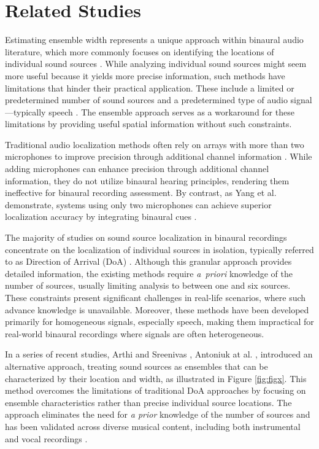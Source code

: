 \section{Related Studies}

Estimating ensemble width represents a unique approach within binaural audio literature, which more commonly focuses on identifying the locations of individual sound sources \cite{benaroya_binaural_2018,ma_speech_2016,ma_exploiting_2017,may_probabilistic_2011,may_robust_2015}. While analyzing individual sound sources might seem more useful because it yields more precise information, such methods have limitations that hinder their practical application. These include a limited or predetermined number of sound sources and a predetermined type of audio signal—typically speech \cite{benaroya_binaural_2018,ma_speech_2016,may_probabilistic_2011,may_robust_2015,yang_deepear_2024}. The ensemble approach serves as a workaround for these limitations by providing useful spatial information without such constraints.

Traditional audio localization methods often rely on arrays with more than two microphones to improve precision through additional channel information \cite{pavlidi_real-time_2012,hahmann_sound_2022,liu_sound_2022}. While adding microphones can enhance precision through additional channel information, they do not utilize binaural hearing principles, rendering them ineffective for binaural recording assessment. By contrast, as Yang et al. demonstrate, systems using only two microphones can achieve superior localization accuracy by integrating binaural cues \cite{yang_deepear_2024}.

The majority of studies on sound source localization in binaural recordings concentrate on the localization of individual sources in isolation, typically referred to as Direction of Arrival (DoA) \cite{benaroya_binaural_2018,ma_speech_2016,ma_exploiting_2017,may_probabilistic_2011,may_robust_2015}. Although this granular approach provides detailed information, the existing methods require \textit{a~priori} knowledge of the number of sources, usually limiting analysis to between one and six sources. These constraints present significant challenges in real-life scenarios, where such advance knowledge is unavailable. Moreover, these methods have been developed primarily for homogeneous signals, especially speech, making them impractical for real-world binaural recordings where signals are often heterogeneous.

In a series of recent studies, Arthi and Sreenivas \cite{arthi_binaural_2022}, Antoniuk at al. \cite{antoniuk_blind_2023,antoniuk_ensemble_2024,antoniuk_estimating_2024}, introduced an alternative approach, treating sound sources as ensembles that can be characterized by their location and width, as illustrated in Figure \ref{fig:figx}. This method overcomes the limitations of traditional DoA approaches by focusing on ensemble characteristics rather than precise individual source locations. The approach eliminates the need for \textit{a prior} knowledge of the number of sources and has been validated across diverse musical content, including both instrumental and vocal recordings \cite{antoniuk_blind_2023,antoniuk_ensemble_2024,antoniuk_estimating_2024}.

